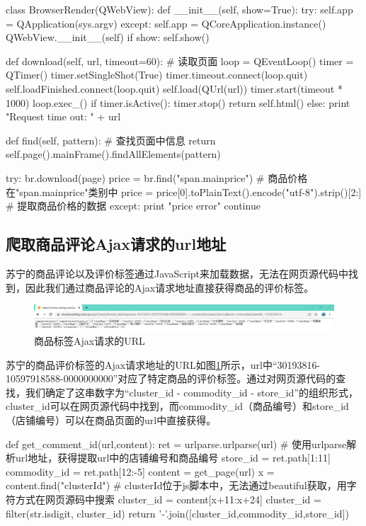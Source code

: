 \begin{python}
class BrowserRender(QWebView):
    def __init__(self, show=True):
        try:
            self.app = QApplication(sys.argv)
        except:
            self.app = QCoreApplication.instance()
        QWebView.__init__(self)
        if show:
            self.show()

    def download(self, url, timeout=60): # 读取页面
        loop = QEventLoop()
        timer = QTimer()
        timer.setSingleShot(True)
        timer.timeout.connect(loop.quit)
        self.loadFinished.connect(loop.quit)
        self.load(QUrl(url))
        timer.start(timeout * 1000)
        loop.exec_()
        if timer.isActive():
            timer.stop()
            return self.html()
        else:
            print "Request time out: " + url

    def find(self, pattern): # 查找页面中信息
       return self.page().mainFrame().findAllElements(pattern)

try:
    br.download(page)
    price = br.find("span.mainprice") # 商品价格在"span.mainprice"类别中
    price = price[0].toPlainText().encode("utf-8").strip()[2:] # 提取商品价格的数据
except:
    print "price error"
    continue
\end{python}

\subsection{爬取商品评论Ajax请求的url地址}

苏宁的商品评论以及评价标签通过JavaScript来加载数据，无法在网页源代码中找到，因此我们通过商品评论的Ajax请求地址直接获得商品的评价标签。

\begin{figure}[htbp]
\centering
\includegraphics[width=13.5cm]{img/fsh/1.jpg}
\caption{商品标签Ajax请求的URL}
\label{fig:fsh_crawler}
\end{figure}

苏宁的商品评价标签的Ajax请求地址的URL如图\ref{fig:fsh_crawler}所示，url中“30193816-10597918588-0000000000”对应了特定商品的评价标签。通过对网页源代码的查找，我们确定了这串数字为“cluster\_id - commodity\_id - store\_id”的组织形式，cluster\_id可以在网页源代码中找到，而commodity\_id（商品编号）和store\_id（店铺编号）可以在商品页面的url中直接获得。


\begin{python}
def get_comment_id(url,content):
    ret = urlparse.urlparse(url) # 使用urlparse解析url地址，获得提取url中的店铺编号和商品编号
    store_id = ret.path[1:11]
    commodity_id = ret.path[12:-5]
    content = get_page(url)
    x = content.find("clusterId") # clusterId位于js脚本中，无法通过beautiful获取，用字符方式在网页源码中搜索
    cluster_id = content[x+11:x+24]
    cluster_id = filter(str.isdigit, cluster_id)
    return '-'.join([cluster_id,commodity_id,store_id])
\end{python}